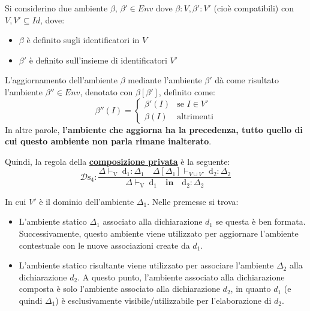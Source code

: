 \documentclass[a4paper]{article}
\begin{document}
	\noindent
	Si considerino due ambiente $\beta$, $\beta' \in Env$ dove $\beta : V, \beta' : V'$ (cioè compatibili) con $V,V' \subseteq Id$, dove:
	\begin{itemize}
		\item $\beta$ è definito sugli identificatori in $V$	
		\item $\beta'$ è definito sull'insieme di identificatori $V'$
	\end{itemize}
	L'aggiornamento dell'ambiente $\beta$ mediante l'ambiente $\beta'$ dà come risultato l'ambiente $\beta''\in Env$, denotato con $\beta\left[\beta'\right]$, definito come:
	\begin{equation*}
		\beta''\left(I\right) = \begin{cases}
			\beta'\left(I\right)	& \text{se } I \in V' \\
			\beta\left(I\right)		& \text{altrimenti}
		\end{cases}
	\end{equation*}
	In altre parole, \textbf{l'ambiente che aggiorna ha la precedenza, tutto quello di cui questo ambiente non parla rimane inalterato}.\newline
	
	\noindent
	Quindi, la regola della \textbf{\underline{composizione privata}} è la seguente:
	\begin{equation*}
		\mathcal{D}\mathrm{s}_{4} : \dfrac{
			\Delta\vdash_{\mathrm{V}} \: \mathrm{d}_{1}:\Delta_{1} \hspace{1em} \Delta\left[\Delta_{1}\right] \vdash_{V \cup V'} \: \mathrm{d}_{2} : \Delta_{2}
		}{
			\Delta\vdash_{\mathrm{V}} \: \mathrm{d}_{1} \hspace{1em} \mathbf{in} \hspace{1em} \mathrm{d}_{2}:\Delta_{2}
		}
	\end{equation*}
	
	\noindent
	In cui $V'$ è il dominio dell'ambiente $\Delta_{1}$. Nelle premesse si trova:
	\begin{itemize}
		\item L'ambiente statico $\Delta_{1}$ associato alla dichiarazione $d_{1}$ se questa è ben formata. Successivamente, questo ambiente viene utilizzato per aggiornare l'ambiente contestuale con le nuove associazioni create da $d_{1}$.
		
		\item L'ambiente statico risultante viene utilizzato per associare l'ambiente $\Delta_{2}$ alla dichiarazione $d_{2}$. A questo punto, l'ambiente associato alla dichiarazione composta è solo l'ambiente associato alla dichiarazione $d_{2}$, in quanto $d_{1}$ (e quindi $\Delta_{1}$) è esclusivamente visibile/utilizzabile per l'elaborazione di $d_{2}$.
	\end{itemize}
\end{document}
